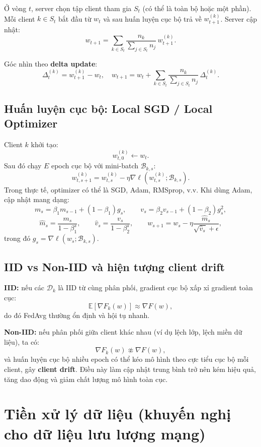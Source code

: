 \documentclass[12pt,a4paper]{article}
\begin{document}
Ở vòng $t$, server chọn tập client tham gia $S_t$ (có thể là toàn bộ hoặc một phần). Mỗi client $k\in S_t$ bắt đầu từ $w_t$ và sau huấn luyện cục bộ trả về $w_{t+1}^{(k)}$. Server cập nhật:
\[
w_{t+1}=\sum_{k\in S_t}\frac{n_k}{\sum_{j\in S_t}n_j}\,w_{t+1}^{(k)}.
\]

Góc nhìn theo \textbf{delta update}:
\[
\Delta_t^{(k)} = w_{t+1}^{(k)} - w_t,
\quad
w_{t+1} = w_t + \sum_{k\in S_t}\frac{n_k}{\sum_{j\in S_t}n_j}\,\Delta_t^{(k)}.
\]

\subsection{Huấn luyện cục bộ: Local SGD / Local Optimizer}

Client $k$ khởi tạo:
\[
w_{t,0}^{(k)} \leftarrow w_t.
\]
Sau đó chạy $E$ epoch cục bộ với mini-batch $\mathcal{B}_{k,s}$:
\[
w_{t,s+1}^{(k)} = w_{t,s}^{(k)} - \eta \nabla \ell\left(w_{t,s}^{(k)};\mathcal{B}_{k,s}\right).
\]
Trong thực tế, optimizer có thể là SGD, Adam, RMSprop, v.v. Khi dùng Adam, cập nhật mang dạng:
\[
m_s = \beta_1 m_{s-1} + (1-\beta_1)g_s,\qquad
v_s = \beta_2 v_{s-1} + (1-\beta_2)g_s^2,
\]
\[
\hat m_s = \frac{m_s}{1-\beta_1^s},\qquad
\hat v_s = \frac{v_s}{1-\beta_2^s},\qquad
w_{s+1}=w_s-\eta\frac{\hat m_s}{\sqrt{\hat v_s}+\epsilon},
\]
trong đó $g_s=\nabla \ell(w_s;\mathcal{B}_{k,s})$.

\subsection{IID vs Non-IID và hiện tượng client drift}

\textbf{IID:} nếu các $\mathcal{D}_k$ là IID từ cùng phân phối, gradient cục bộ xấp xỉ gradient toàn cục:
\[
\mathbb{E}\left[\nabla F_k(w)\right]\approx \nabla F(w),
\]
do đó FedAvg thường ổn định và hội tụ nhanh.

\textbf{Non-IID:} nếu phân phối giữa client khác nhau (ví dụ lệch lớp, lệch miền dữ liệu), ta có:
\[
\nabla F_k(w) \not\approx \nabla F(w),
\]
và huấn luyện cục bộ nhiều epoch có thể kéo mô hình theo cực tiểu cục bộ mỗi client, gây \textbf{client drift}. Điều này làm cập nhật trung bình trở nên kém hiệu quả, tăng dao động và giảm chất lượng mô hình toàn cục.

\section{Tiền xử lý dữ liệu (khuyến nghị cho dữ liệu lưu lượng mạng)}
\end{document}
